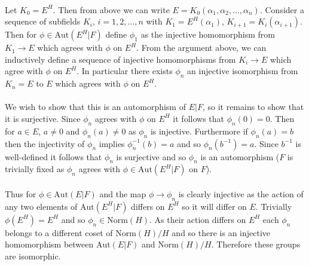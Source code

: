\documentclass{article}
\begin{document}
\paragraph{}
Let $K_0 = E^H$. Then from above we can write $E = K_0(\alpha_1,\alpha_2,\dots,\alpha_n)$.
Consider a sequence of subfields $K_i$, $i = 1,2,\dots,n$ with $K_1 = E^H(\alpha_1)$, $K_{i+1} = K_i(\alpha_{i+1})$. 
Then for $\phi \in \text{Aut}(E^H|F)$ define $\phi_1$ as the injective homomorphism from 
$K_1 \rightarrow E$ which agrees with $\phi$ on $E^H$. From the argument above, we can inductively define a 
sequence of injective homomorphisms from $K_i \rightarrow E$ which agree with $\phi$ on $E^H$. 
In particular there exists $\phi_n$ an injective isomorphism from $K_n = E$ to $E$ which agrees 
with $\phi$ on $E^H$.

\paragraph{}
We wish to show that this is an automorphism of $E|F$, so it remains to show that it is surjective. 
Since $\phi_n$ agrees with $\phi$ on $E^H$ it follows that $\phi_n(0) = 0$. Then for $a \in E$, 
$a \neq 0$ and $\phi_n(a) \neq 0$ as $\phi_n$ is injective. Furthermore if $\phi_n(a) = b$ then 
the injectivity of $\phi_n$ implies $\phi_n^{-1}(b) = a$ and so $\phi_n(b^{-1}) = a$. Since 
$b^{-1}$ is well-defined it follows that $\phi_n$ is surjective and so $\phi_n$ is an automorphism 
($F$ is trivially fixed as $\phi_n$ agrees with $\phi \in \text{Aut}(E^H|F)$ on $F$). 

\paragraph{}
Thus for $\phi \in \text{Aut}(E|F)$ and the map $\phi \rightarrow \phi_n$ is 
clearly injective as the action of any two elements of $\text{Aut}(E^H|F)$ differs on $E^H$ 
so it will differ on $E$. Trivially $\phi(E^H) = E^H$ and so $\phi_n \in \text{Norm}(H)$. 
As their action differs on $E^H$ each $\phi_n$ belongs to a different coset of $\text{Norm}(H)/H$ 
and so there is an injective homomorphism between $\text{Aut}(E|F)$ and $\text{Norm}(H)/H$. Therefore 
these groups are isomorphic.
\end{document}
